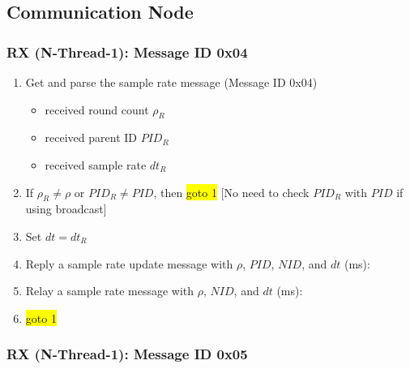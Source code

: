 \documentclass[letterpaper,9pt]{article}
\begin{document}
\subsection{Communication Node}

\subsubsection{RX (N-Thread-1): Message ID 0x04}

\begin{enumerate}
	\item Get and parse the sample rate message (Message ID 0x04)
	\begin{itemize}
		\item received round count $\rho_R$
		\item received parent ID $PID_R$
		\item received sample rate $dt_R$
	\end{itemize}
		\item If $\rho_R \neq \rho$ or $PID_R \neq PID$, then \colorbox{yellow}{goto 1} [No need to check $PID_R$ with $PID$ if using broadcast]
		\item Set $dt=dt_R$
		\item Reply a sample rate update message with $\rho$, $PID$, $NID$, and $dt$ (ms):\\
		\item Relay a sample rate message with $\rho$, $NID$, and $dt$ (ms):\\
	\item \colorbox{yellow}{goto 1}
\end{enumerate}

\subsubsection{RX (N-Thread-1): Message ID 0x05}
\end{document}

